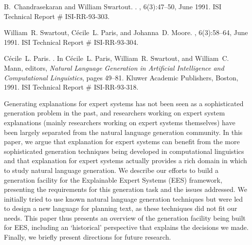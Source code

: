 \begin{thebibliography}{10}
B.~Chandrasekaran and William Swartout.
.
, 6(3):47--50, June 1991.
\newblock ISI Technical Report \# ISI-RR-93-303.

\noindent\hspace*{\itemindent}{\leftskip=0.1in\rightskip=0.1in\hrulefill}

William~R. Swartout, C\'{e}cile~L. Paris, and Johanna~D. Moore.
, 6(3):58--64, June 1991.
\newblock ISI Technical Report \# ISI-RR-93-304.

\noindent\hspace*{\itemindent}{\leftskip=0.1in\rightskip=0.1in\hrulefill}


C\'{e}cile~L. Paris.
.
\newblock In C\'{e}cile~L. Paris, William~R. Swartout, and William~C. Mann,
  editors, {\em Natural Language Generation in Artificial Intelligence and
  Computational Linguistics}, pages 49--81. Kluwer Academic Publishers, Boston,
  1991.
\newblock ISI Technical Report \# ISI-RR-93-318.

{\leftskip=0.1in\rightskip=0.1in\begin{small}\par{}Generating explanations for expert systems has not been seen as a
  sophisticated generation problem in the past, and researchers working on
  expert system explanations (mainly researchers working on expert systems
  themselves) have been largely separated from the natural language generation
  community. In this paper, we argue that explanation for expert systems can
  benefit from the more sophisticated generation techniques being developed in
  computational linguistics and that explanation for expert systems actually
  provides a rich domain in which to study natural language generation. We
  describe our efforts to build a generation facility for the Explainable
  Expert Systems (EES) framework, presenting the requirements for this
  generation task and the issues addressed. We initially tried to use known
  natural language generation techniques but were led to design a new language
  for planning text, as these techniques did not fit our needs. This paper thus
  presents an overview of the generation facility being built for EES,
  including an `historical' perspective that explains the decisions we made.
  Finally, we briefly present directions for future research.\end{small}\par}
\noindent\hspace*{\itemindent}{\leftskip=0.1in\rightskip=0.1in\hrulefill}


\end{thebibliography}
